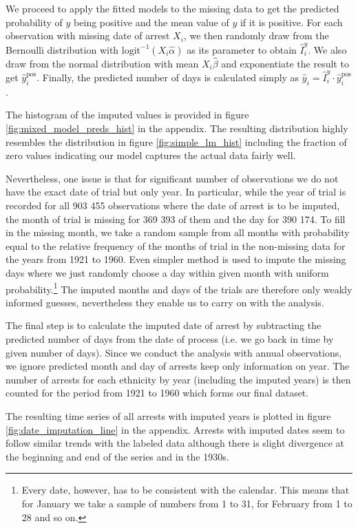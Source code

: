 We  proceed to apply the fitted models to the missing data to get the predicted probability of $y$  being positive and the mean value of $y$ if it is positive. For each observation with missing date of arrest $X_i$, we then randomly draw from the Bernoulli distribution with  $\text{logit}^{-1} \left(X_i \hat\alpha \right)$ as its parameter to obtain $\hat I_i^y$. We also draw from the normal distribution with mean $X_i \hat\beta$ and exponentiate the result to get $\hat y_i^{\text{pos}}$. Finally, the predicted number of days is calculated simply as $\hat y_i = \hat I_i^y \cdot \hat y_i^{\text{pos}}$. 

The histogram of the imputed values is provided in figure \ref{fig:mixed_model_preds_hist} in the appendix. 
The resulting distribution  highly resembles the distribution  in figure \ref{fig:simple_lm_hist} including the fraction of zero values indicating our model captures the actual data fairly well. 

Nevertheless,  one issue is that for significant number of observations we do not have the exact date of trial but only year. In particular, 
while the year of trial is recorded for all 903 455 observations where the date of arrest is to be imputed, the month of trial is missing for 369 393 of them and the day for 390 174. 
To fill in the missing month, we take a random sample from all months with probability equal to the relative frequency of the months of trial in the non-missing data for the years from 1921 to 1960. 
Even simpler method is used to impute the missing days where we just randomly choose a day within given month with uniform probability.\footnote{Every date, however, has to be consistent with the calendar. This means that for January we take a sample of numbers from 1 to 31, for February from 1 to 28 and so on. } 
The imputed months and days of the trials are therefore only weakly informed guesses, nevertheless they enable us to carry on with the analysis. 

The final step is to calculate the imputed date of arrest by subtracting the predicted number of days from the date of process (i.e. we go back in time by given number of days). Since we conduct the analysis with annual observations, we ignore predicted month and day of arrests  keep only information on year. The number of arrests for each ethnicity by year (including the imputed years) is then counted for the period from 1921 to 1960 which forms our final dataset. 

The resulting time series of all arrests with imputed years is plotted in figure \ref{fig:date_imputation_line} in the appendix. Arrests with imputed dates seem to follow  similar trends with the labeled data  although there is slight divergence at the beginning and end of the series and in the 1930s.
